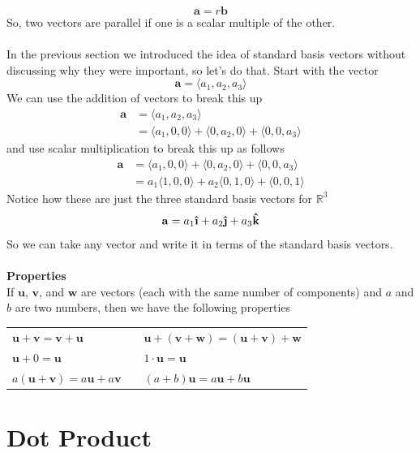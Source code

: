 \documentclass[10pt,reqno]{book}
\theoremstyle{definition}
\renewcommand{\vec}[1]{\mathbf{#1}}
\newcommand{\uvec}[1]{\boldsymbol{\hat{\textbf{#1}}}}
\def\R{\mathbb{R}}
\begin{document}
	\[ \vec{a} = r\vec{b} \]
	So, two vectors are parallel if one is a scalar multiple of the other.\\ \\
	In the previous section we introduced the idea of standard basis vectors without discussing why they were important, so let's do that. Start with the vector
	\[ \vec{a} = \langle a_1,a_2,a_3 \rangle \]
	We can use the addition of vectors to break this up
	\begin{align*}
		\vec{a} &= \langle a_1,a_2,a_3 \rangle\\
				&= \langle a_1,0,0 \rangle + \langle 0,a_2,0 \rangle + \langle 0,0,a_3 \rangle
	\end{align*}
	and use scalar multiplication to break this up as follows
	\begin{align*}
		\vec{a} &= \langle a_1,0,0 \rangle + \langle 0,a_2,0 \rangle + \langle 0,0,a_3 \rangle \\
				&= a_1 \langle 1,0,0 \rangle + a_2 \langle 0,1,0 \rangle + \langle 0,0,1 \rangle
	\end{align*}
	Notice how these are just the three standard basis vectors for $\R^3$
	\[ \vec{a} = a_1\uvec{\i} + a_2\uvec{\j} + a_3\uvec{k} \]
	So we can take any vector and write it in terms of the standard basis vectors.\\ \\
	\textbf{Properties}\\
	If $\vec{u}$, $\vec{v}$, and $\vec{w}$ are vectors (each with the same number of components) and $a$ and $b$ are two numbers, then we have the following properties

	\begin{center}
		\begin{tabular}{lcl}
			$\vec{u} + \vec{v} = \vec{v} + \vec{u}$ & & $\vec{u} + (\vec{v} + \vec{w}) = 	(\vec{u} + \vec{v}) + \vec{w}$\\	
			$\vec{u} + 0 = \vec{u}$ & & $1 \cdot \vec{u} = \vec{u}$\\	
			$a(\vec{u} + \vec{v}) = a\vec{u} + a\vec{v}$ & & $(a+b)\vec{u} = a\vec{u} + b	\vec{u}$
		\end{tabular}
	\end{center}

	\section{Dot Product}
\end{document}
